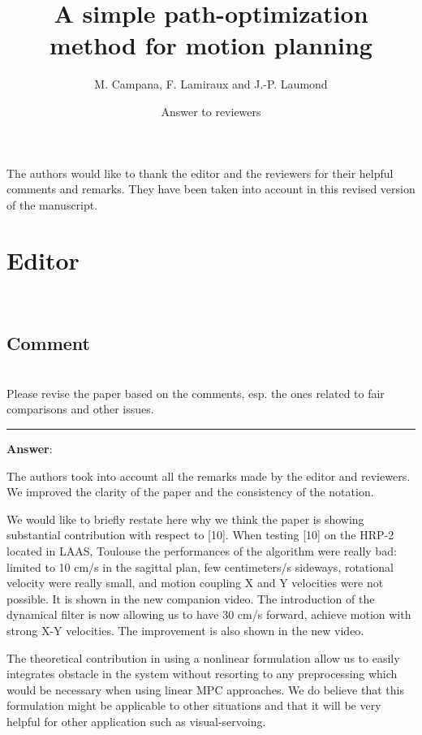 \documentclass{scrartcl}
\begin{document}
\title{A simple path-optimization method for motion planning}
\author{M. Campana, F. Lamiraux and J.-P. Laumond}
\date{Answer to reviewers}
\maketitle

The authors would like to thank the editor and the reviewers for their helpful comments and remarks.
They have been taken into account in this revised version of the manuscript.

\section{Editor}

\hrulefill\\

\subsection{Comment}
\hrulefill\\

Please revise the paper based on the comments, esp. the ones related to fair comparisons and other issues.

\rule{\linewidth}{.1pt}
\textbf{Answer}:

The authors took into account all the remarks made by the editor and reviewers.
We improved the clarity of the paper and the consistency of the notation.

We would like to briefly restate here why we think the paper is showing substantial contribution with respect to [10].
When testing [10] on the HRP-2 located in LAAS, Toulouse the performances of the algorithm were really bad: limited to 10 cm/s in the sagittal plan, 
few centimeters/s sideways, rotational velocity were really small, and motion coupling X and Y velocities were not possible.
It is shown in the new companion video. 
The introduction of the dynamical filter is now allowing us to have 30 cm/s forward, achieve motion with strong X-Y velocities.
The improvement is also shown in the new video.

The theoretical contribution in using a nonlinear formulation allow us to easily integrates obstacle in the system without resorting to any preprocessing
which would be necessary when using linear MPC approaches.
We do believe that this formulation might be applicable to other situations and that it will be very helpful for other application such as visual-servoing.
 
\end{document}
